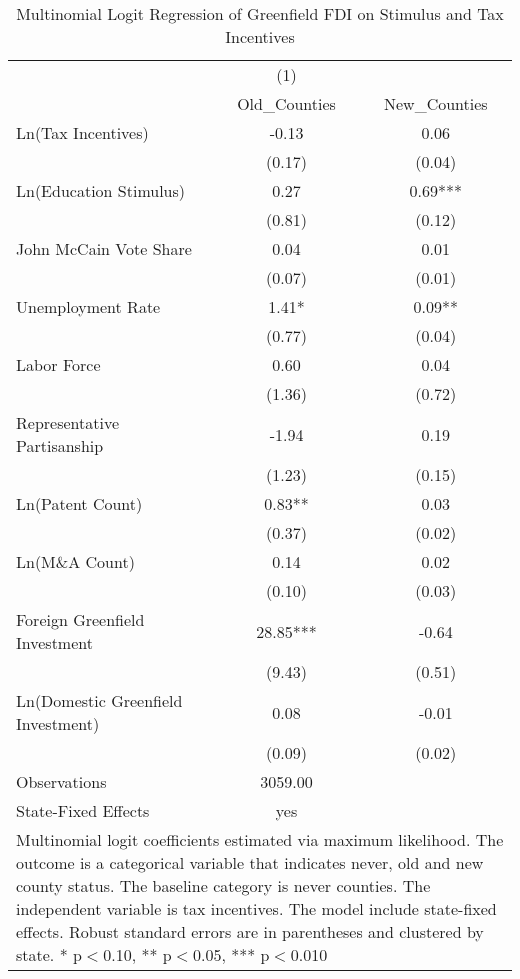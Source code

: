 \begin{table}[!htbp]\centering
\def\sym#1{\ifmmode^{#1}\else\(^{#1}\)\fi}
\caption{Multinomial Logit Regression of Greenfield FDI on Stimulus and Tax Incentives}
\begin{tabular}{l*{2}{c}}
\hline\hline
                    &         (1)   &               \\
                    &Old_Counties   &New_Counties   \\
\hline
Ln(Tax Incentives)  &       -0.13   &        0.06   \\
                    &      (0.17)   &      (0.04)   \\
Ln(Education Stimulus)&        0.27   &        0.69***\\
                    &      (0.81)   &      (0.12)   \\
John McCain Vote Share&        0.04   &        0.01   \\
                    &      (0.07)   &      (0.01)   \\
Unemployment Rate   &        1.41*  &        0.09** \\
                    &      (0.77)   &      (0.04)   \\
Labor Force         &        0.60   &        0.04   \\
                    &      (1.36)   &      (0.72)   \\
Representative Partisanship&       -1.94   &        0.19   \\
                    &      (1.23)   &      (0.15)   \\
Ln(Patent Count)    &        0.83** &        0.03   \\
                    &      (0.37)   &      (0.02)   \\
Ln(M\&A Count)      &        0.14   &        0.02   \\
                    &      (0.10)   &      (0.03)   \\
Foreign Greenfield Investment&       28.85***&       -0.64   \\
                    &      (9.43)   &      (0.51)   \\
Ln(Domestic Greenfield Investment)&        0.08   &       -0.01   \\
                    &      (0.09)   &      (0.02)   \\
\hline
Observations        &     3059.00   &               \\
State-Fixed Effects &         yes   &               \\
\hline\hline
\multicolumn{3}{p{\linewidth}}{\footnotesize Multinomial logit coefficients estimated via maximum likelihood. The outcome is a categorical variable that indicates  never, old and new county status. The baseline category is never counties. The independent variable is tax incentives. The model include state-fixed effects. Robust standard errors are in parentheses and clustered by state. * p$<$0.10, ** p$<$0.05, *** p$<$0.010}\\
\end{tabular}
\end{table}
